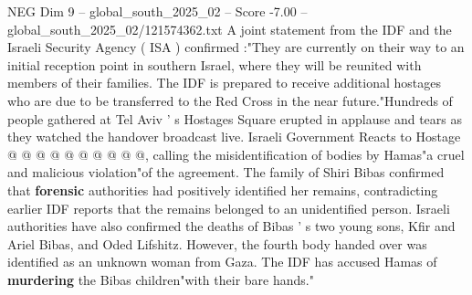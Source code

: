 \begin{textsample}{NEG Dim 9 – global\_south\_2025\_02 – Score -7.00 – global\_south\_2025\_02/121574362.txt}
A joint statement from the IDF and the Israeli Security Agency ( ISA ) confirmed :"They are currently on their way to an initial reception point in southern Israel, where they will be reunited with members of their families.
The IDF is prepared to receive additional hostages who are due to be transferred to the Red Cross in the near future."Hundreds of people gathered at Tel Aviv ' s Hostages Square erupted in applause and tears as they watched the handover broadcast live.
Israeli Government Reacts to Hostage @ @ @ @ @ @ @ @ @ @, calling the misidentification of bodies by Hamas"a cruel and malicious violation"of the agreement.
The family of Shiri Bibas confirmed that \textbf{forensic} authorities had positively identified her remains, contradicting earlier IDF reports that the remains belonged to an unidentified person.
Israeli authorities have also confirmed the deaths of Bibas ' s two young sons, Kfir and Ariel Bibas, and Oded Lifshitz.
However, the fourth body handed over was identified as an unknown woman from Gaza.
The IDF has accused Hamas of \textbf{murdering} the Bibas children"with their bare hands."

\end{textsample}
